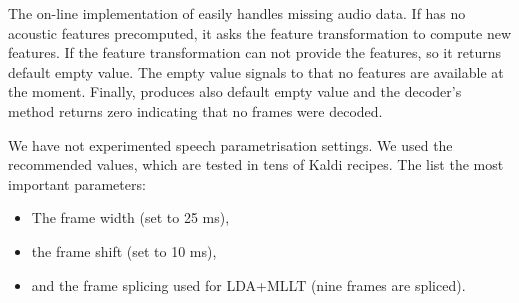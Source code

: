 The on-line implementation  of  easily handles missing audio data.
If  has no acoustic features precomputed, it asks the feature transformation to compute new features.
If the feature transformation can not provide the features, so it returns default empty value. 
The empty value signals to  that no features are available at the moment. 
Finally,  produces also default empty value and the decoder's method  returns zero indicating that no frames were decoded.

We have not experimented speech parametrisation settings. 
We used the recommended values, which are tested in tens of Kaldi recipes.
The list the most important parameters:
\begin{itemize}
    \item The frame width (set to 25 ms), 
    \item the frame shift (set to 10 ms), 
    \item and the frame splicing used for \ac{LDA}+\ac{MLLT} (nine frames are spliced).
\end{itemize}



